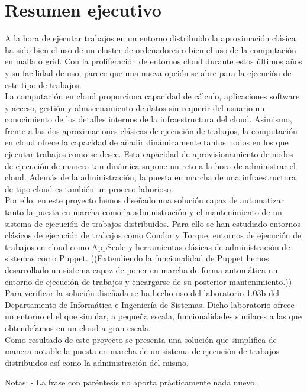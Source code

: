 \chapter{Resumen ejecutivo}
\label{cap:resumen}

{\sf

A la hora de ejecutar trabajos en un entorno distribuido la aproximación clásica ha sido bien el uso de un cluster de ordenadores o bien el uso de la computación en malla o grid. Con la proliferación de entornos cloud durante estos últimos años y su facilidad de uso, parece que una nueva opción se abre para la ejecución de este tipo de trabajos.\\

La computación en cloud proporciona capacidad de cálculo, aplicaciones software y acceso, gestión y almacenamiento de datos sin requerir del usuario un conocimiento de los detalles internos de la infraestructura del cloud. Asimismo, frente a las dos aproximaciones clásicas de ejecución de trabajos, la computación en cloud ofrece la capacidad de añadir dinámicamente tantos nodos en los que ejecutar trabajos como se desee. Esta capacidad de aprovisionamiento de nodos de ejecución de manera tan dinámica supone un reto a la hora de administrar el cloud. Además de la administración, la puesta en marcha de una infraestructura de tipo cloud es también un proceso laborioso.\\

Por ello, en este proyecto hemos diseñado una solución capaz de automatizar tanto la puesta en marcha como la administración y el mantenimiento de un sistema de ejecución de trabajos distribuidos. Para ello se han estudiado entornos clásicos de ejecución de trabajos como Condor y Torque, entornos de ejecución de trabajos en cloud como AppScale y herramientas clásicas de administración de sistemas como Puppet. ((Extendiendo la funcionalidad de Puppet hemos desarrollado un sistema capaz de poner en marcha de forma automática un entorno de ejecución de trabajos y encargarse de su posterior mantenimiento.)) Para verificar la solución diseñada se ha hecho uso del laboratorio 1.03b del Departamento de Informática e Ingeniería de Sistemas. Dicho laboratorio ofrece un entorno el el que simular, a pequeña escala, funcionalidades similares a las que obtendríamos en un cloud a gran escala.\\

Como resultado de este proyecto se presenta una solución que simplifica de manera notable la puesta en marcha de un sistema de ejecución de trabajos distribuidos así como la administración del mismo.
}

Notas: 
- La frase con paréntesis no aporta prácticamente nada nuevo.
